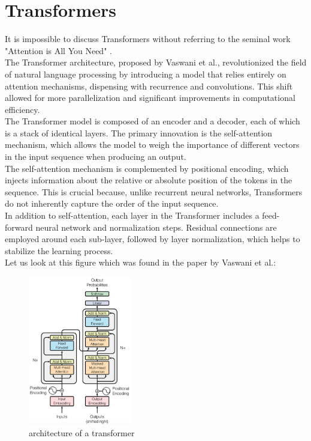 \section{Transformers}

It is impossible to discuss Transformers without referring to the seminal work "Attention is All You Need" \cite{vaswani2023attention}.\\

The Transformer architecture, proposed by Vaswani et al., revolutionized the field of natural language processing by introducing a model that relies entirely on attention mechanisms, dispensing with recurrence and convolutions. This shift allowed for more parallelization and significant improvements in computational efficiency.\\

The Transformer model is composed of an encoder and a decoder, each of which is a stack of identical layers. The primary innovation is the self-attention mechanism, which allows the model to weigh the importance of different vectors in the input sequence when producing an output. \\

The self-attention mechanism is complemented by positional encoding, which injects information about the relative or absolute position of the tokens in the sequence. This is crucial because, unlike recurrent neural networks, Transformers do not inherently capture the order of the input sequence.\\

In addition to self-attention, each layer in the Transformer includes a feed-forward neural network and normalization steps. Residual connections are employed around each sub-layer, followed by layer normalization, which helps to stabilize the learning process.\\

Let us look at this figure which was found in the paper by Vaswani et al.:\\

\begin{figure}[ht]
    \centering
    \includegraphics[width=0.4\textwidth]{media/Architecture_transfo.png}
    \caption{architecture of a transformer}
    \label{fig:transfo}
\end{figure}

